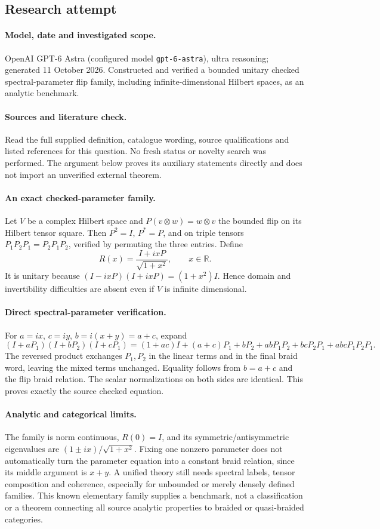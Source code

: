 \documentclass[11pt]{article}
\begin{document}
\subsection{Research attempt}
\paragraph{Model, date and investigated scope.}
OpenAI GPT-6 Astra (configured model \texttt{gpt-6-astra}), ultra reasoning; generated 11 October 2026. Constructed and verified a bounded unitary checked spectral-parameter flip family, including infinite-dimensional Hilbert spaces, as an analytic benchmark.

\paragraph{Sources and literature check.}
Read the full supplied definition, catalogue wording, source qualifications and listed references for this question. No fresh status or novelty search was performed. The argument below proves its auxiliary statements directly and does not import an unverified external theorem.

\paragraph{An exact checked-parameter family.} Let \(V\) be a complex Hilbert space and \(P(v\otimes w)=w\otimes v\) the bounded flip on its Hilbert tensor square. Then \(P^2=I\), \(P^*=P\), and on triple tensors \(P_1P_2P_1=P_2P_1P_2\), verified by permuting the three entries. Define
\[
 R(x)=\frac{I+ixP}{\sqrt{1+x^2}},\qquad x\in\mathbb R.
\]
It is unitary because \((I-ixP)(I+ixP)=(1+x^2)I\). Hence domain and invertibility difficulties are absent even if \(V\) is infinite dimensional.
\paragraph{Direct spectral-parameter verification.} For \(a=ix\), \(c=iy\), \(b=i(x+y)=a+c\), expand
\[
 (I+aP_1)(I+bP_2)(I+cP_1)
 =(1+ac)I+(a+c)P_1+bP_2
 +abP_1P_2+bcP_2P_1+abcP_1P_2P_1.
\]
The reversed product exchanges \(P_1,P_2\) in the linear terms and in the final braid word, leaving the mixed terms unchanged. Equality follows from \(b=a+c\) and the flip braid relation. The scalar normalizations on both sides are identical. This proves exactly the source checked equation.
\paragraph{Analytic and categorical limits.} The family is norm continuous, \(R(0)=I\), and its symmetric/antisymmetric eigenvalues are \((1\pm ix)/\sqrt{1+x^2}\). Fixing one nonzero parameter does not automatically turn the parameter equation into a constant braid relation, since its middle argument is \(x+y\). A unified theory still needs spectral labels, tensor composition and coherence, especially for unbounded or merely densely defined families. This known elementary family supplies a benchmark, not a classification or a theorem connecting all source analytic properties to braided or quasi-braided categories.
\end{document}

